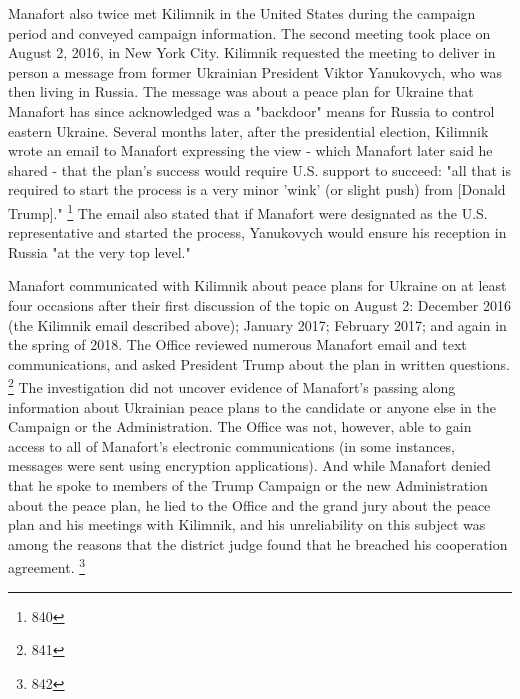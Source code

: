 Manafort also twice met Kilimnik in the United States during the campaign period and conveyed campaign information.
The second meeting took place on August 2, 2016, in New York City.
Kilimnik requested the meeting to deliver in person a message from former Ukrainian President Viktor Yanukovych, who was then living in Russia.
The message was about a peace plan for Ukraine that Manafort has since acknowledged was a "backdoor" means for Russia to control eastern Ukraine.
Several months later, after the presidential election, Kilimnik wrote an email to Manafort expressing the view - which Manafort later said he shared - that the plan's success would require U.S. support to succeed: "all that is required to start the process is a very minor 'wink' (or slight push) from [Donald Trump]."%
\footnote{840}
The email also stated that if Manafort were designated as the U.S. representative and started the process, Yanukovych would ensure his reception in Russia "at the very top level."

Manafort communicated with Kilimnik about peace plans for Ukraine on at least four occasions after their first discussion of the topic on August 2: December 2016 (the Kilimnik email described above); January 2017; February 2017; and again in the spring of 2018.
The Office reviewed numerous Manafort email and text communications, and asked President Trump about the plan in written questions.%
\footnote{841}
The investigation did not uncover evidence of Manafort's passing along information about Ukrainian peace plans to the candidate or anyone else in the Campaign or the Administration.
The Office was not, however, able to gain access to all of Manafort's electronic communications (in some instances, messages were sent using encryption applications).
And while Manafort denied that he spoke to members of the Trump Campaign or the new Administration about the peace plan, he lied to the Office and the grand jury about the peace plan and his meetings with Kilimnik, and his unreliability on this subject was among the reasons that the district judge found that he breached his cooperation agreement.%
\footnote{842}

